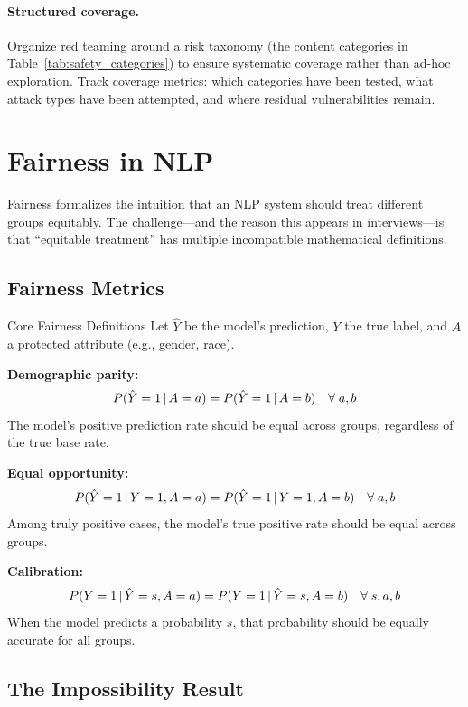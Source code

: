\paragraph{Structured coverage.}
Organize red teaming around a risk taxonomy (the content categories in
Table~\ref{tab:safety_categories}) to ensure systematic coverage rather than
ad-hoc exploration.  Track coverage metrics: which categories have been tested,
what attack types have been attempted, and where residual vulnerabilities
remain.

\section{Fairness in NLP}
\label{sec:fairness}

Fairness formalizes the intuition that an NLP system should treat different
groups equitably.  The challenge---and the reason this appears in interviews---is
that ``equitable treatment'' has multiple incompatible mathematical definitions.

\subsection{Fairness Metrics}

\begin{mathresult}{Core Fairness Definitions}
Let $\hat{Y}$ be the model's prediction, $Y$ the true label, and $A$ a
protected attribute (e.g., gender, race).

\textbf{Demographic parity:}
\[
    P(\hat{Y} = 1 \,|\, A = a) = P(\hat{Y} = 1 \,|\, A = b)
    \quad \forall\; a, b
\]
The model's positive prediction rate should be equal across groups,
regardless of the true base rate.

\textbf{Equal opportunity:}
\[
    P(\hat{Y} = 1 \,|\, Y = 1, A = a) = P(\hat{Y} = 1 \,|\, Y = 1, A = b)
    \quad \forall\; a, b
\]
Among truly positive cases, the model's true positive rate should be equal
across groups.

\textbf{Calibration:}
\[
    P(Y = 1 \,|\, \hat{Y} = s, A = a) = P(Y = 1 \,|\, \hat{Y} = s, A = b)
    \quad \forall\; s, a, b
\]
When the model predicts a probability $s$, that probability should be
equally accurate for all groups.
\end{mathresult}

\subsection{The Impossibility Result}

